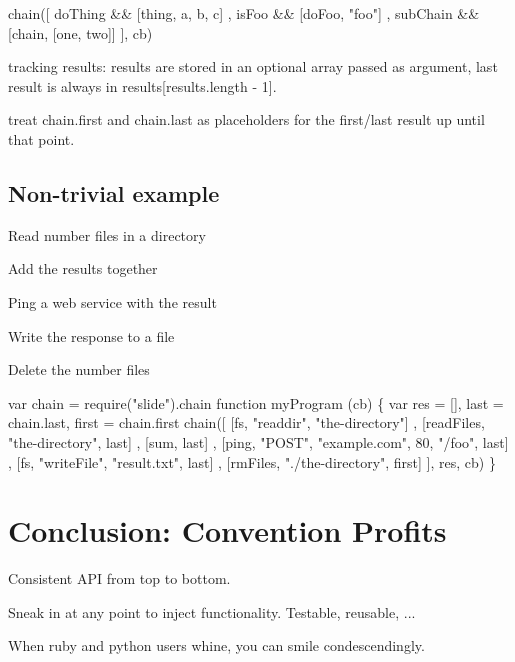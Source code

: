 \begin{DoxyCode}
chain([
  doThing && [thing, a, b, c]
, isFoo && [doFoo, "foo"]
, subChain && [chain, [one, two]]
], cb)
\end{DoxyCode}



\begin{DoxyItemize}
\item tracking results\+: results are stored in an optional array passed as argument, last result is always in results\mbox{[}results.\+length -\/ 1\mbox{]}.
\item treat chain.\+first and chain.\+last as placeholders for the first/last result up until that point.
\end{DoxyItemize}

\subsection*{Non-\/trivial example}


\begin{DoxyItemize}
\item Read number files in a directory
\item Add the results together
\item Ping a web service with the result
\item Write the response to a file
\item Delete the number files
\end{DoxyItemize}


\begin{DoxyCode}
var chain = require("slide").chain
function myProgram (cb) \{
  var res = [], last = chain.last, first = chain.first
  chain([
    [fs, "readdir", "the-directory"]
  , [readFiles, "the-directory", last]
  , [sum, last]
  , [ping, "POST", "example.com", 80, "/foo", last]
  , [fs, "writeFile", "result.txt", last]
  , [rmFiles, "./the-directory", first]
  ], res, cb)
\}
\end{DoxyCode}


\section*{Conclusion\+: Convention Profits}


\begin{DoxyItemize}
\item Consistent A\+PI from top to bottom.
\item Sneak in at any point to inject functionality. Testable, reusable, ...
\item When ruby and python users whine, you can smile condescendingly. 
\end{DoxyItemize}